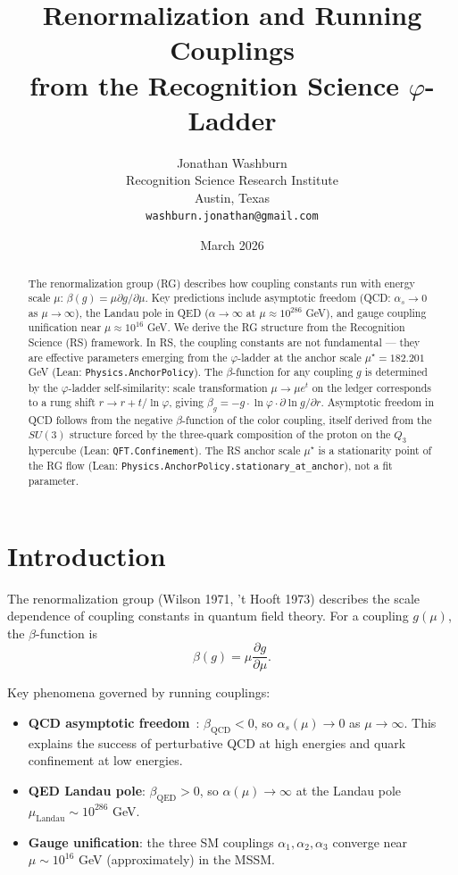 \documentclass[12pt,a4paper]{article}
\title{Renormalization and Running Couplings\\
from the Recognition Science $\varphi$-Ladder}
\author{Jonathan Washburn\\
Recognition Science Research Institute\\
Austin, Texas\\
\texttt{washburn.jonathan@gmail.com}}
\date{March 2026}
\theoremstyle{definition}
\theoremstyle{remark}
\begin{document}
\maketitle

\begin{abstract}
The renormalization group (RG) describes how coupling constants run with
energy scale $\mu$: $\beta(g) = \mu \partial g/\partial\mu$.  Key
predictions include asymptotic freedom (QCD: $\alpha_s \to 0$ as $\mu
\to \infty$), the Landau pole in QED ($\alpha \to \infty$ at
$\mu \approx 10^{286}$ GeV), and gauge coupling unification near
$\mu \approx 10^{16}$ GeV.  We derive the RG structure from the
Recognition Science (RS) framework.  In RS, the coupling constants are
not fundamental — they are effective parameters emerging from the
$\varphi$-ladder at the anchor scale $\mu^\star = 182.201$ GeV (Lean:
\texttt{Physics.AnchorPolicy}).  The $\beta$-function for any coupling
$g$ is determined by the $\varphi$-ladder self-similarity: scale
transformation $\mu \to \mu e^t$ on the ledger corresponds to a rung
shift $r \to r + t/\ln\varphi$, giving $\beta_g = -g \cdot \ln\varphi
\cdot \partial\ln g/\partial r$.  Asymptotic freedom in QCD follows
from the negative $\beta$-function of the color coupling, itself derived
from the $SU(3)$ structure forced by the three-quark composition of the
proton on the $Q_3$ hypercube (Lean: \texttt{QFT.Confinement}).  The
RS anchor scale $\mu^\star$ is a stationarity point of the RG flow
(Lean: \texttt{Physics.AnchorPolicy.stationary\_at\_anchor}), not a
fit parameter.
\end{abstract}

\section{Introduction}
\label{sec:intro}

The renormalization group (Wilson 1971, 't Hooft 1973) describes the
scale dependence of coupling constants in quantum field theory.  For
a coupling $g(\mu)$, the $\beta$-function is
\begin{equation}
  \beta(g) = \mu \frac{\partial g}{\partial\mu}.
  \label{eq:beta}
\end{equation}

Key phenomena governed by running couplings:
\begin{itemize}
  \item \textbf{QCD asymptotic freedom}~\cite{Gross1973,Politzer1973}:
        $\beta_\mathrm{QCD} < 0$, so $\alpha_s(\mu) \to 0$ as $\mu
        \to \infty$.  This explains the success of perturbative QCD
        at high energies and quark confinement at low energies.
  \item \textbf{QED Landau pole}: $\beta_\mathrm{QED} > 0$,
        so $\alpha(\mu) \to \infty$ at the Landau pole
        $\mu_\mathrm{Landau} \sim 10^{286}$ GeV.
  \item \textbf{Gauge unification}: the three SM couplings
        $\alpha_1, \alpha_2, \alpha_3$ converge near $\mu \sim 10^{16}$
        GeV (approximately) in the MSSM.
\end{itemize}
\end{document}
